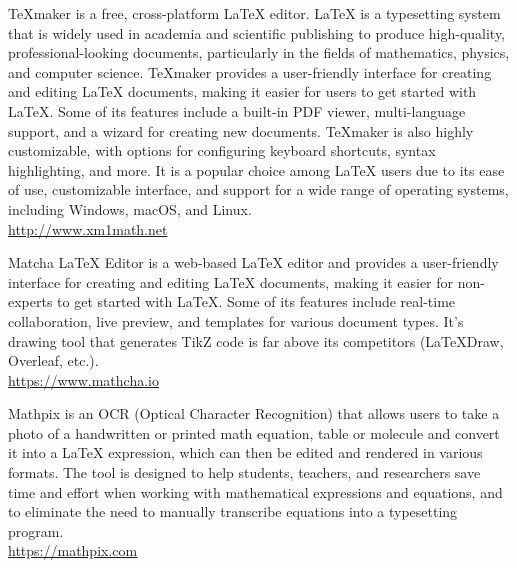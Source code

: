 	{\Large {}}{\Large {}}{\Large {}}{\Large {}} TeXmaker is a free, cross-platform \LaTeX{} editor. \LaTeX{} is a typesetting system that is widely used in academia and scientific publishing to produce high-quality, professional-looking documents, particularly in the fields of mathematics, physics, and computer science. TeXmaker provides a user-friendly interface for creating and editing LaTeX documents, making it easier for users to get started with LaTeX. Some of its features include a built-in PDF viewer, multi-language support, and a wizard for creating new documents. TeXmaker is also highly customizable, with options for configuring keyboard shortcuts, syntax highlighting, and more. It is a popular choice among LaTeX users due to its ease of use, customizable interface, and support for a wide range of operating systems, including Windows, macOS, and Linux.\\
	\href{http://www.xm1math.net/texmaker/index.html}{\color{blue}http://www.xm1math.net}
	
	{\Large {}}{\Large {}}{\Large {}}{\Large {}} Matcha LaTeX Editor is a web-based LaTeX editor and provides a user-friendly interface for creating and editing LaTeX documents, making it easier for non-experts to get started with LaTeX. Some of its features include real-time collaboration, live preview, and templates for various document types. It's drawing tool that generates TikZ code is far above its competitors (LaTeXDraw, Overleaf, etc.).\\
	\href{https://www.mathcha.io}{\color{blue}https://www.mathcha.io}
	
	{\Large {}}{\Large {}}{\Large {}}{\Large {}} Mathpix is an OCR (Optical Character Recognition) that allows users to take a photo of a handwritten or printed math equation, table or molecule and convert it into a LaTeX expression, which can then be edited and rendered in various formats. The tool is designed to help students, teachers, and researchers save time and effort when working with mathematical expressions and equations, and to eliminate the need to manually transcribe equations into a typesetting program.\\
	\href{https://mathpix.com}{\color{blue}https://mathpix.com}
	
